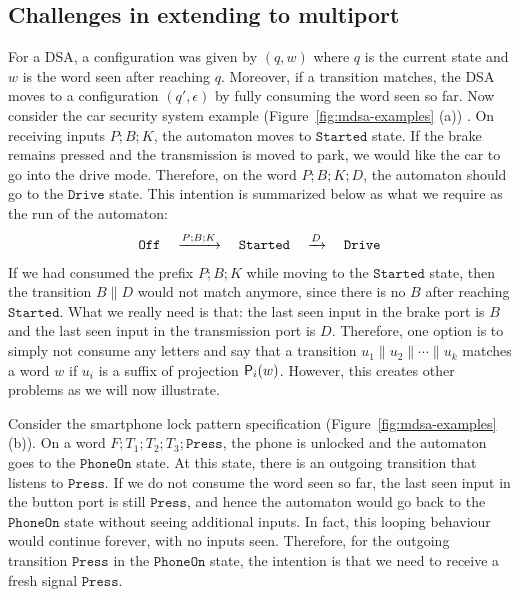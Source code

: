 \subsection{Challenges in extending to multiport}
\label{sec:challenges}

For a DSA, a configuration was given by $(q, w)$ where $q$ is the current state and $w$ is the word seen after reaching $q$. Moreover, if a transition matches, the DSA moves to a configuration $(q', \epsilon)$ by fully consuming the word seen so far. Now consider the car security system example (Figure~\ref{fig:mdsa-examples} (a)) . On receiving inputs $P;B;K$, the automaton moves to $\mathtt{Started}$ state.
If the brake remains pressed and the transmission is moved to park, we would like the car to go into the drive mode. Therefore, on the word $P;B;K;D$, the automaton should go to the $\mathtt{Drive}$ state. This intention is summarized below as what we require as the run of the automaton:
\begin{align*}
  \mathtt{Off} \quad \xrightarrow{P;B;K} \quad \mathtt{Started} \quad \xrightarrow{D} \quad \mathtt{Drive}
  \end{align*} 
 If we had consumed the prefix $P;B;K$ while moving to the $\mathtt{Started}$ state, then the transition $B \parallel D$ would not match anymore, since there is no $B$ after reaching $\mathtt{Started}$. What we really need is that: the last seen input in the brake port is $B$ and the last seen input in the transmission port is $D$. Therefore, one option is to simply not consume any letters and say that a transition $u_1 \parallel u_2 \parallel \cdots \parallel u_k$ matches a word $w$ if $u_i$ is a suffix of projection $\mathsf{P}_{i}(w)$. However, this creates other problems as we will now illustrate. 
 
 Consider the smartphone lock pattern specification (Figure~\ref{fig:mdsa-examples} (b)). On a word $F; T_1; T_2; T_3; \mathtt{Press}$, the phone is unlocked and the automaton goes to the $\mathtt{PhoneOn}$ state. At this state, there is an outgoing transition that listens to $\mathtt{Press}$. If we do not consume the word seen so far, the last seen input in the button port is still $\mathtt{Press}$, and hence the automaton would go back to the $\mathtt{PhoneOn}$ state without seeing additional inputs. In fact, this looping behaviour would continue forever, with no inputs seen. Therefore, for the outgoing transition $\mathtt{Press}$ in the $\mathtt{PhoneOn}$ state, the intention is that we need to receive a fresh signal $\mathtt{Press}$.  
 
